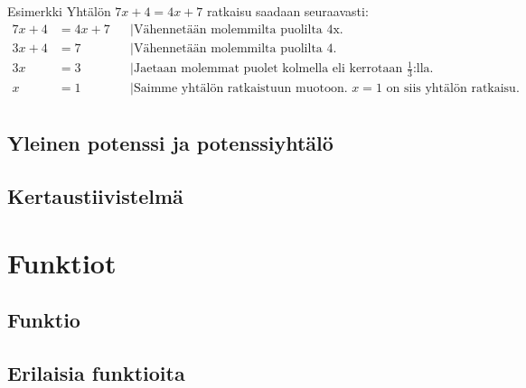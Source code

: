 Esimerkki
Yhtälön $7x+4=4x+7$ ratkaisu saadaan seuraavasti:
\begin{align*}
7x+4 &= 4x+7 & &| \text{Vähennetään molemmilta puolilta 4x.} \\
3x+4 &= 7 & &| \text{Vähennetään molemmilta puolilta 4.} \\
3x &= 3 & &| \text{Jaetaan molemmat puolet kolmella eli kerrotaan $\frac{1}{3}$:lla.} \\
x &= 1 & &| \text{Saimme yhtälön ratkaistuun muotoon. $x=1$ on siis yhtälön ratkaisu.} \\
\end{align*}


\chapter{Yleinen potenssi ja potenssiyhtälö}
\chapter{Kertaustiivistelmä}

\part{Funktiot}
\chapter{Funktio}
\chapter{Erilaisia funktioita}